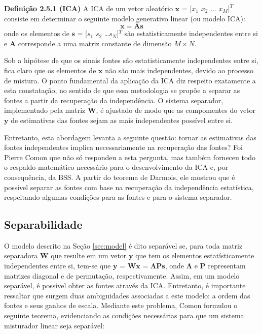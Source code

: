     \medskip
    
    \textbf{Definição 2.5.1 (ICA)} A ICA de um vetor aleatório $\mathbf{x}$ = [${x_1}$ ${x_2}$ $\dots$  ${x_M}]^T$ consiste em determinar o seguinte modelo generativo linear (ou modelo ICA):
    \begin{equation}\label{eq:simplifiedmixer}
        \mathbf{x} = \mathbf{A}\mathbf{s}
    \end{equation}
    onde os elementos de $\mathbf{s}$ = [${s_1}$ ${s_2}$ \dots  ${s_N}$]$^T$ são estatisticamente independentes entre si e $\mathbf{A}$ corresponde a uma matriz constante de dimensão $M\times N$.

    Sob a hipótese de que os sinais fontes são estatisticamente independentes entre si, fica claro que os elementos de $\mathbf{x}$ não são mais independentes, devido ao processo de mistura. O ponto fundamental da aplicação da ICA diz respeito exatamente a esta constatação, no sentido de que essa metodologia se propõe a separar as fontes a partir da recuperação da independência. O sistema separador, implementado pela matriz $\mathbf{W}$, é ajustado de modo que as compomentes do vetor $\mathbf{y}$ de estimativas das fontes sejam as mais independentes possível entre si.
    
    Entretanto, esta abordagem levanta a seguinte questão: tornar as estimativas das fontes independentes implica necessariamente na recuperação das fontes? Foi Pierre Comon \cite{Comon} que não só respondeu a esta pergunta, mas também forneceu todo o respaldo matemático necessário para o desenvolvimento da ICA e, por consequência, da BSS.
    A partir do teorema de Darmois, ele mostrou que é possível separar as fontes com base na recuperação da independência estatística, respeitando algumas condições para as fontes e para o sistema separador.

\subsection{Separabilidade}\label{sec:separability}

    O modelo descrito na Seção \ref{sec:model} é dito separável se, para toda matriz separadora $\mathbf{W}$ que resulte em um vetor $\mathbf{y}$ que tem os elementos estatísticamente independentes entre si, tem-se que $\mathbf{y}$ = $\mathbf{Wx}$ = $\mathbf{\Lambda P s}$, onde $\mathbf{\Lambda}$ e $\mathbf{P}$ representam matrizes diagonal e de permutação, respectivamente. Assim, em um modelo separável, é possível obter as fontes através da ICA. Entretanto, é importante ressaltar que surgem duas ambiguidades associadas a este modelo: a ordem das fontes e seus ganhos de escala. Mediante este problema, Comon \cite{Comon} formulou o seguinte teorema, evidenciando as condições necessárias para que um sistema misturador linear seja separável:
    

